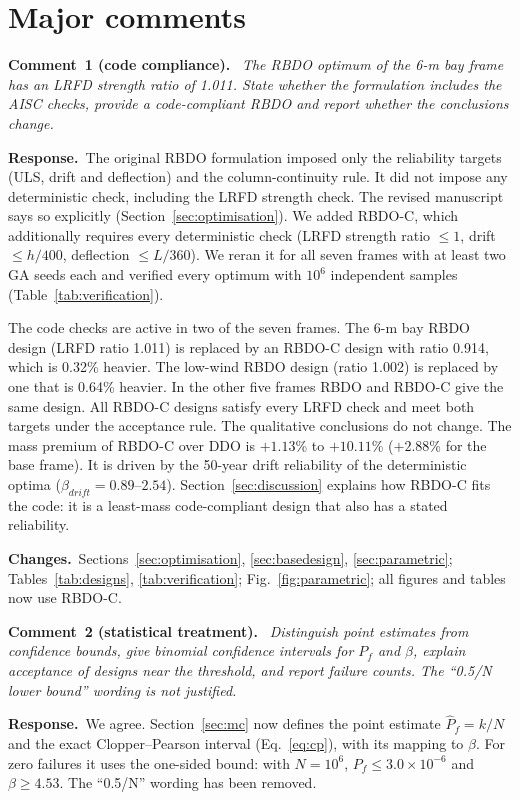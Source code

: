 \documentclass[11pt]{article}
\newcounter{rc}
\newenvironment{comment}[1]{\refstepcounter{rc}\par\medskip\noindent\textbf{Comment~#1.}\ \itshape}{\par}
\newcommand{\resp}{\par\noindent\textbf{Response.}\ }
\newcommand{\chg}{\par\noindent\textbf{Changes.}\ }
\begin{document}
\section*{Major comments}

\begin{comment}{1 (code compliance)}
The RBDO optimum of the 6-m bay frame has an LRFD strength ratio of 1.011. State whether the
formulation includes the AISC checks, provide a code-compliant RBDO and report whether the conclusions
change.
\end{comment}
\resp The original RBDO formulation imposed only the reliability targets (ULS, drift and deflection)
and the column-continuity rule. It did not impose any deterministic check, including the LRFD strength
check. The
revised manuscript says so explicitly (Section~\ref{sec:optimisation}). We added RBDO-C, which
additionally requires every deterministic check (LRFD strength ratio $\le 1$, drift $\le h/400$,
deflection $\le L/360$). We reran it for all seven frames with at least two GA seeds each and
verified every optimum with $10^6$ independent samples (Table~\ref{tab:verification}).

The code checks are active in two of the seven frames. The 6-m bay RBDO design (LRFD ratio 1.011) is
replaced by an RBDO-C design with ratio 0.914, which is 0.32\% heavier. The low-wind RBDO design (ratio
1.002) is replaced by one that is 0.64\% heavier. In the other five frames RBDO and RBDO-C give the same
design. All RBDO-C designs satisfy every LRFD check and meet both targets under the acceptance rule. The
qualitative conclusions do not change. The mass premium of RBDO-C over DDO is $+1.13$\% to $+10.11$\%
($+2.88$\% for the base frame). It is driven by the 50-year drift reliability of the deterministic
optima ($\beta_{drift}=0.89$--$2.54$). Section~\ref{sec:discussion} explains how RBDO-C fits the code:
it is a least-mass code-compliant design that also has a stated reliability.
\chg Sections~\ref{sec:optimisation}, \ref{sec:basedesign}, \ref{sec:parametric};
Tables~\ref{tab:designs}, \ref{tab:verification}; Fig.~\ref{fig:parametric}; all figures and tables now
use RBDO-C.

\begin{comment}{2 (statistical treatment)}
Distinguish point estimates from confidence bounds, give binomial confidence intervals for $P_f$ and
$\beta$, explain acceptance of designs near the threshold, and report failure counts. The ``0.5/N lower
bound'' wording is not justified.
\end{comment}
\resp We agree. Section~\ref{sec:mc} now defines the point estimate $\hat P_f=k/N$ and the exact
Clopper--Pearson interval (Eq.~\eqref{eq:cp}), with its mapping to $\beta$. For zero failures it uses
the one-sided bound: with $N=10^6$, $P_f\le 3.0\times10^{-6}$ and $\beta\ge4.53$. The ``0.5/N''
wording has been removed.
\end{document}
